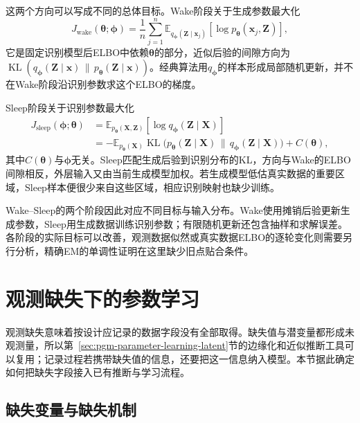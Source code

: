 这两个方向可以写成不同的总体目标。Wake阶段关于生成参数最大化
\begin{equation}
  J_{\mathrm{wake}}(\bm{\theta};\bm{\phi})
  =\frac{1}{n}\sum_{j=1}^n
    \mathbb{E}_{q_{\bm{\phi}}(\bm{Z}\mid\bm{x}_j)}
      [\log p_{\bm{\theta}}(\bm{x}_j,\bm{Z})],
  \label{eq:pgm-parameter-learning-wake-objective}
\end{equation}
它是固定识别模型后ELBO中依赖$\bm{\theta}$的部分，近似后验的间隙方向为$\operatorname{KL}(q_{\bm{\phi}}(\bm{Z}\mid\bm{x})\,\|\,p_{\bm{\theta}}(\bm{Z}\mid\bm{x}))$。经典算法用$q_{\bm{\phi}}$的样本形成局部随机更新，并不在Wake阶段沿识别参数求这个ELBO的梯度。

Sleep阶段关于识别参数最大化
\begin{equation}
  \begin{aligned}
    J_{\mathrm{sleep}}(\bm{\phi};\bm{\theta})
      &=\mathbb{E}_{p_{\bm{\theta}}(\bm{X},\bm{Z})}
          [\log q_{\bm{\phi}}(\bm{Z}\mid\bm{X})]\\
      &=-\mathbb{E}_{p_{\bm{\theta}}(\bm{X})}
          \operatorname{KL}\bigl(
            p_{\bm{\theta}}(\bm{Z}\mid\bm{X})
            \,\|\,q_{\bm{\phi}}(\bm{Z}\mid\bm{X})\bigr)+C(\bm{\theta}),
  \end{aligned}
  \label{eq:pgm-parameter-learning-sleep-objective}
\end{equation}
其中$C(\bm{\theta})$与$\bm{\phi}$无关。Sleep匹配生成后验到识别分布的KL，方向与Wake的ELBO间隙相反，外层输入又由当前生成模型加权。若生成模型低估真实数据的重要区域，Sleep样本便很少来自这些区域，相应识别映射也缺少训练。

Wake--Sleep的两个阶段因此对应不同目标与输入分布。Wake使用摊销后验更新生成参数，Sleep用生成数据训练识别参数；有限随机更新还包含抽样和求解误差。各阶段的实际目标可以改善，观测数据似然或真实数据ELBO的逐轮变化则需要另行分析，精确EM的单调性证明在这里缺少旧点贴合条件。

\section{观测缺失下的参数学习}
\label{sec:pgm-parameter-learning-incomplete}

观测缺失意味着按设计应记录的数据字段没有全部取得。缺失值与潜变量都形成未观测量，所以第~\ref{sec:pgm-parameter-learning-latent}节的边缘化和近似推断工具可以复用；记录过程若携带缺失值的信息，还要把这一信息纳入模型。本节据此确定如何把缺失字段接入已有推断与学习流程。

\subsection{缺失变量与缺失机制}
\label{sec:pgm-parameter-learning-missingness}

